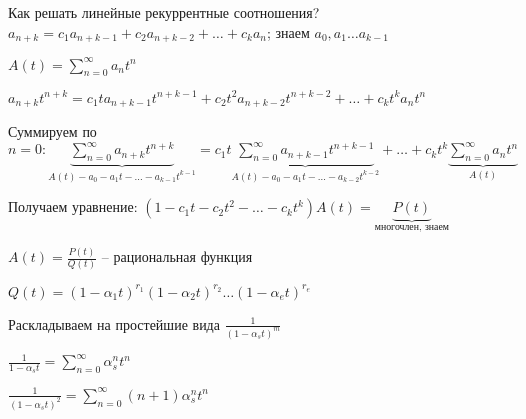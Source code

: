 \documentclass[12pt]{article}
\begin{document}
\begin{nota}{Как решать линейные рекуррентные соотношения?}
    $a_{n + k} = c_1a_{n + k - 1} + c_2a_{n + k - 2} + \ldots + c_ka_n$; знаем $a_0, a_1 \ldots a_{k - 1}$

    $A(t) = \sum\limits_{n = 0}^\infty a_nt^n$

    $a_{n + k}t^{n + k} = c_1ta_{n + k - 1}t^{n + k - 1} + c_2t^2a_{n + k - 2}t^{n + k - 2} + \ldots + c_kt^ka_nt^n$

    Суммируем по $n = 0 : \underbrace{\sum\limits_{n = 0}^\infty a_{n + k}t^{n + k}}_{A(t) - a_0 - a_1t - \ldots - a_{k - 1}t^{k - 1}} = c_1t\underbrace{\sum\limits_{n = 0}^\infty a_{n + k - 1}t^{n + k - 1}}_{A(t) - a_0 - a_1t - \ldots - a_{k - 2}t^{k - 2}} + \ldots + c_kt^k\underbrace{\sum\limits_{n = 0}^\infty a_nt^n}_{A(t)}$

    Получаем уравнение: $(1 - c_1t - c_2t^2 - \ldots - c_kt^k)A(t) = \underbrace{P(t)}_\text{многочлен, знаем}$

    $A(t) = \frac{P(t)}{Q(t)}$ -- рациональная функция 

    $Q(t) = (1 - \alpha_1t)^{r_1} (1 - \alpha_2t)^{r_2} \ldots (1 - \alpha_et)^{r_e}$

    Раскладываем на простейшие вида $\frac{1}{(1 - \alpha_s t)^{m}}$

    $\frac{1}{1 - \alpha_s t} = \sum\limits_{n = 0}^\infty \alpha_s^nt^n$

    $\frac{1}{(1 - \alpha_st)^2} = \sum\limits_{n = 0}^\infty (n + 1)\alpha_s^nt^n$
\end{nota}
\end{document}
